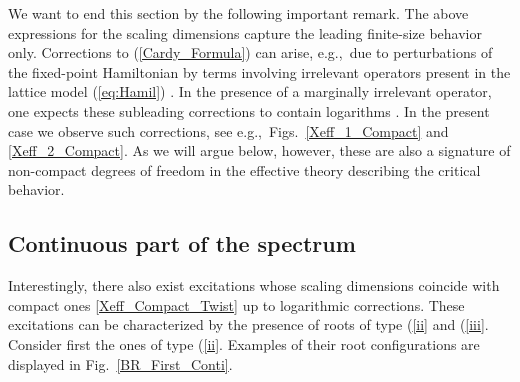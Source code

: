 \documentclass[12pt]{article}
\numberwithin{equation}{section}
\begin{document}
	We want to end this section by the following important remark. The above expressions for the scaling dimensions capture the leading finite-size behavior only. Corrections to (\ref{Cardy_Formula}) can arise, e.g.,\ due to perturbations of the fixed-point Hamiltonian by terms involving irrelevant operators present in the lattice model (\ref{eq:Hamil}) \cite{Card86a}. In the presence of a marginally irrelevant operator, one expects these subleading corrections to contain logarithms \cite{Card86c}.  In the present case we observe such corrections, see e.g.,\ Figs.~\ref{Xeff_1_Compact} and \ref{Xeff_2_Compact}.  As we will argue below, however, these are also a signature of non-compact degrees of freedom in the effective theory describing the critical behavior.
	
	\subsection{Continuous part of the spectrum}
	
	Interestingly, there also exist excitations whose scaling dimensions coincide with compact ones \eqref{Xeff_Compact_Twist} up to logarithmic corrections. These excitations can be characterized by the presence of roots of type (\ref{ii} and (\ref{iii}. Consider first the ones of type (\ref{ii}. Examples of their root configurations are displayed in Fig.~\ref{BR_First_Conti}. 
	
\end{document}
